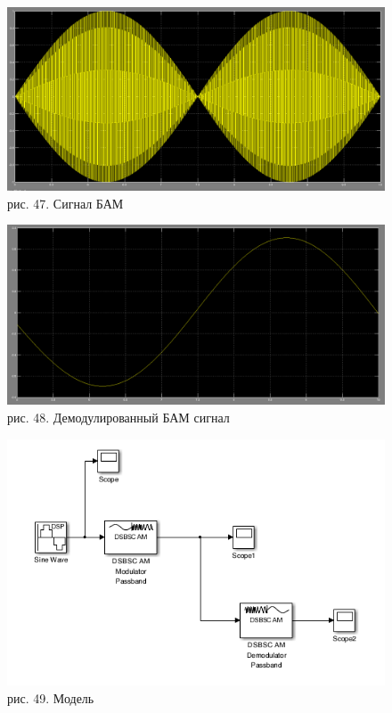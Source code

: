 \documentclass[10pt,a4paper]{report}
\begin{document}
\begin{figure}
\begin{center}
\includegraphics[width=150mm, scale = 0.9]{7_19}\newline
рис. 47. Сигнал БАМ\newline
\end{center}
\end{figure}
\begin{figure}
\begin{center}
\includegraphics[width=150mm, scale = 0.9]{7_20.png}\newline
рис. 48. Демодулированный БАМ сигнал \newline
\end{center}
\end{figure}
\begin{figure}
\begin{center}
\includegraphics[width=150mm, scale = 0.9]{7_21.png}\newline
рис. 49. Модель\newline
\end{center}
\end{figure}
\end{document}
